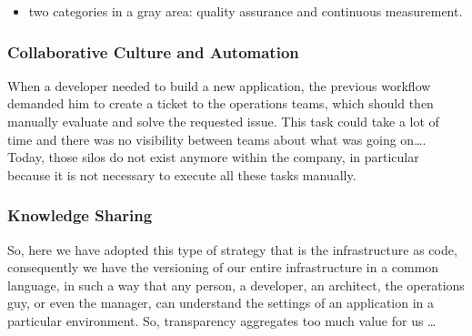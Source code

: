 \documentclass{beamer}
\newcommand{\memph}[1]{\alert{#1}}
\begin{document}
\begin{frame}
  
    \begin{itemize}
      \item two categories in a gray area: quality assurance and continuous measurement. 
    \end{itemize}

    
\end{frame}


\begin{frame}
  \frametitle{Collaborative Culture and Automation}

  \begin{flushright}
    When a developer needed to build a new application, the \memph{previous workflow
    demanded him to create a ticket to the operations teams}, which should then
    manually evaluate and solve the requested issue. This task could take a lot
    of time and there was no visibility between teams about what was going on\ldots.
    Today, \memph{those silos do not exist anymore within the company}, in particular because
    \memph{it is not necessary to execute all these tasks manually}. 
  \end{flushright} 
\end{frame}

\begin{frame}
  \frametitle{Knowledge Sharing}

  \begin{flushright}
    So, here we have adopted this type of strategy that is the \memph{infrastructure as code},
    consequently we have the versioning of our entire infrastructure \memph{in a common language},
    in such a way that \memph{any person}, a developer, an architect, the operations guy, or even
    the manager, \memph{can understand the settings of an application} in a particular environment.
    So, transparency aggregates too much value for us \ldots 
  \end{flushright}
\end{frame}
\end{document}
